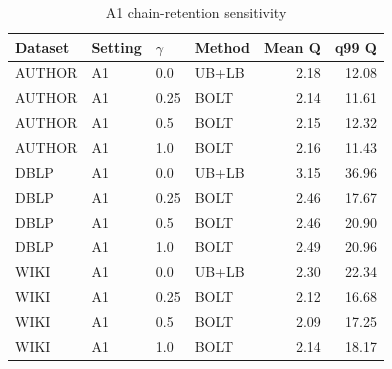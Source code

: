 \begin{table}[H]
\centering
\small
\setlength{\tabcolsep}{5pt}
\caption{A1 chain-retention sensitivity}
\label{tab:D_ratio}
\begin{tabular}{@{}llllrr@{}}
\toprule
Dataset & Setting & $\gamma$ & Method & Mean Q & q99 Q \\
\midrule
AUTHOR & A1 & 0.0 & UB+LB & 2.18 & 12.08 \\
AUTHOR & A1 & 0.25 & BOLT & 2.14 & 11.61 \\
AUTHOR & A1 & 0.5 & BOLT & 2.15 & 12.32 \\
AUTHOR & A1 & 1.0 & BOLT & 2.16 & 11.43 \\
DBLP & A1 & 0.0 & UB+LB & 3.15 & 36.96 \\
DBLP & A1 & 0.25 & BOLT & 2.46 & 17.67 \\
DBLP & A1 & 0.5 & BOLT & 2.46 & 20.90 \\
DBLP & A1 & 1.0 & BOLT & 2.49 & 20.96 \\
WIKI & A1 & 0.0 & UB+LB & 2.30 & 22.34 \\
WIKI & A1 & 0.25 & BOLT & 2.12 & 16.68 \\
WIKI & A1 & 0.5 & BOLT & 2.09 & 17.25 \\
WIKI & A1 & 1.0 & BOLT & 2.14 & 18.17 \\
\bottomrule
\end{tabular}
\end{table}
